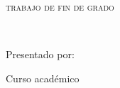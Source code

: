 
\begin{titlepage}
  \AddToShipoutPicture*{\BackgroundPic}

  \begin{addmargin}[2.575cm]{0cm}
  \begin{flushleft}
    \Large  
    \hfill\vfil

    \textsf{\miFacultad}
    \vfill\vfill

    {\huge\textsf\miGrado} \vfill


    \textsc{trabajo de fin de grado}

    \begingroup
    \Huge{\miTitulo} \\ \bigskip
    \endgroup

    \vfill\vfill\vfill\vfill

    \textsf{\normalsize{Presentado por:}}\\
    {\Large\textrm{\miNombre}}

    \vfill
    \textsf{Curso académico \miCurso}
  \end{flushleft}  
  \end{addmargin}       

\end{titlepage}   
\cleardoublepage
\endinput
